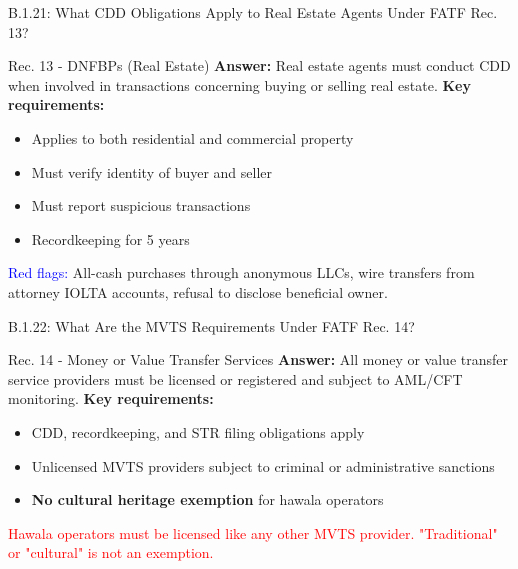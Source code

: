 \documentclass{beamer}
\begin{document}
	\begin{frame}{B.1.21: What CDD Obligations Apply to Real Estate Agents Under FATF Rec. 13?}
		\begin{block}{Rec. 13 - DNFBPs (Real Estate)}
			\textbf{Answer:} Real estate agents must conduct CDD when involved in transactions concerning buying or selling real estate.
			\vspace{0.2cm}
			\textbf{Key requirements:}
			\begin{itemize}
				\item Applies to both residential and commercial property
				\item Must verify identity of buyer and seller
				\item Must report suspicious transactions
				\item Recordkeeping for 5 years
			\end{itemize}
			\textcolor{blue}{Red flags:} All-cash purchases through anonymous LLCs, wire transfers from attorney IOLTA accounts, refusal to disclose beneficial owner.
		\end{block}
	\end{frame}
	
	\begin{frame}{B.1.22: What Are the MVTS Requirements Under FATF Rec. 14?}
		\begin{block}{Rec. 14 - Money or Value Transfer Services}
			\textbf{Answer:} All money or value transfer service providers must be licensed or registered and subject to AML/CFT monitoring.
			\vspace{0.2cm}
			\textbf{Key requirements:}
			\begin{itemize}
				\item CDD, recordkeeping, and STR filing obligations apply
				\item Unlicensed MVTS providers subject to criminal or administrative sanctions
				\item \textbf{No cultural heritage exemption} for hawala operators
			\end{itemize}
			\textcolor{red}{Hawala operators must be licensed like any other MVTS provider. "Traditional" or "cultural" is not an exemption.}
		\end{block}
	\end{frame}
	
\end{document}
